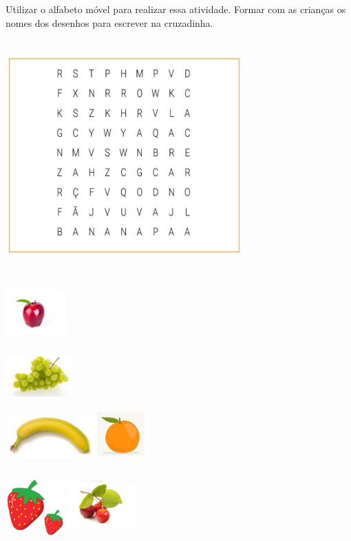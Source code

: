 Utilizar o alfabeto móvel para realizar essa atividade. Formar com as
crianças os nomes dos desenhos para escrever na cruzadinha.

\includegraphics[width=3.58333in,height=3.51667in]{media/image97.jpg}

\includegraphics[width=0.92708in,height=0.84375in]{media/image98.jpg}

\includegraphics[width=1.02083in,height=0.67986in]{media/image99.jpg}

\includegraphics[width=1.38958in,height=0.65208in]{media/image100.jpg}\includegraphics[width=0.71875in,height=0.71875in]{media/image101.jpg}

\includegraphics[width=0.89097in,height=0.85417in]{media/image102.jpg}\includegraphics[width=1.07847in,height=0.97917in]{media/image103.jpg}


